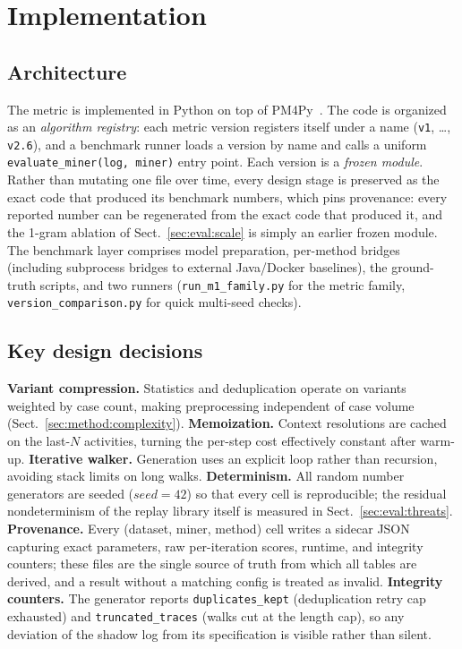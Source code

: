 \documentclass[runningheads]{llncs}
\newcommand{\chg}[1]{\textcolor{chgblue}{#1}}
\begin{document}
\section{Implementation}
\label{sec:impl}

\subsection{Architecture}
\label{sec:impl:arch}
The metric is implemented in Python on top of PM4Py~\cite{berti2019pm4py}. The code is organized as an \emph{algorithm registry}: each metric version registers itself under a name (\texttt{v1}, \dots, \texttt{v2.6}), and a benchmark runner loads a version by name and calls a uniform \texttt{evaluate\_miner(log, miner)} entry point. Each version is a \emph{frozen module}. Rather than mutating one file over time, every design stage is preserved as the exact code that produced its benchmark numbers\chg{, which pins provenance: every reported number can be regenerated from the exact code that produced it, and the 1-gram ablation of Sect.~\ref{sec:eval:scale} is simply an earlier frozen module}. The benchmark layer comprises model preparation, per-method bridges (including subprocess bridges to external Java/Docker baselines), the ground-truth scripts, and two runners (\texttt{run\_m1\_family.py} for the metric family, \texttt{version\_comparison.py} for quick multi-seed checks).

\subsection{Key design decisions}
\label{sec:impl:decisions}
\textbf{Variant compression.} Statistics and deduplication operate on variants weighted by case count, making preprocessing independent of case volume (Sect.~\ref{sec:method:complexity}). \textbf{Memoization.} Context resolutions are cached on the last-$N$ activities, turning the per-step cost effectively constant after warm-up. \textbf{Iterative walker.} Generation uses an explicit loop rather than recursion, avoiding stack limits on long walks. \textbf{Determinism.} All random number generators are seeded ($\mathit{seed}{=}42$) so that every cell is reproducible\chg{; the residual nondeterminism of the replay library itself is measured in Sect.~\ref{sec:eval:threats}}. \textbf{Provenance.} Every (dataset, miner, method) cell writes a sidecar JSON capturing exact parameters, raw per-iteration scores, runtime, and integrity counters; these files are the single source of truth from which all tables are derived, and a result without a matching config is treated as invalid. \textbf{Integrity counters.} The generator reports \texttt{duplicates\_kept} (deduplication retry cap exhausted) and \texttt{truncated\_traces} (walks cut at the length cap), so any deviation of the shadow log from its specification is visible rather than silent.
\end{document}
